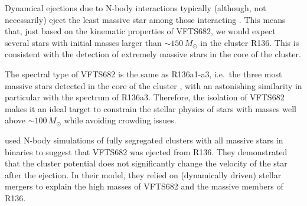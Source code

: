 \documentclass[apjl,twocolumn]{emulateapj}
\newcommand{\kms}{{\,\mathrm{km\ s^{-1}}}}
\begin{document}
Dynamical ejections due to N-body interactions typically (although, not necessarily) eject the least
massive star among those interacting \cite[e.g.,][]{banerjee:12}. This means that, just
based on the kinematic properties of VFTS682, we would expect several
stars with initial masses larger than $\sim$$150\,M_\odot$ in the
cluster R136.
This is consistent with the detection
of extremely massive stars in the core of the
cluster. %

The spectral type of VFTS682
\citep[WNh5,][]{bestenlehner:11} is the same as R136a1-a3, i.e.~the
three most massive stars detected in the core of the cluster%
, with an astonishing similarity in particular with
the spectrum of R136a3. Therefore, the isolation of
VFTS682 makes it an ideal target to constrain the stellar physics of
stars with masses well above $\sim$$100\,M_\odot$ while avoiding
crowding issues. %

\citet{banerjee:12} used N-body simulations of fully segregated
clusters with all massive stars in binaries to suggest that VFTS682
was ejected from R136. They
demonstrated that the cluster potential does not significantly change
the velocity of the star after the ejection. In their
model, they relied on (dynamically driven) stellar mergers to explain the high masses of
VFTS682 and the massive members of R136.%
\end{document}
